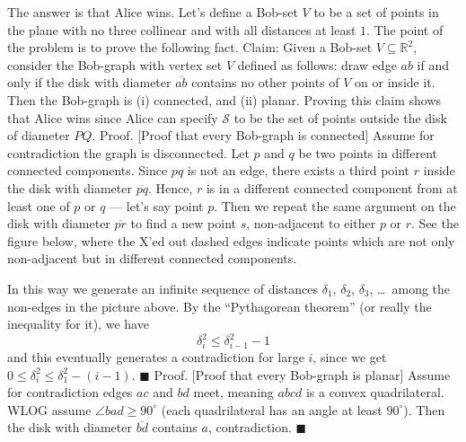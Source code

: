 The answer is that Alice wins. Let's define a Bob-set $V$ to be a set of points in the plane with no three collinear and with all distances at least $1$. The point of the problem is to prove the following fact.
Claim: Given a Bob-set $V \subseteq {\mathbb R}^2$, consider the Bob-graph with vertex set $V$ defined as follows: draw edge $ab$ if and only if the disk with diameter $\overline{ab}$ contains no other points of $V$ on or inside it. Then the Bob-graph is (i) connected, and (ii) planar.
Proving this claim shows that Alice wins since Alice can specify $\mathcal{S}$ to be the set of points outside the disk of diameter $PQ$.
Proof. [Proof that every Bob-graph is connected] Assume for contradiction the graph is disconnected. Let $p$ and $q$ be two points in different connected components. Since $pq$ is not an edge, there exists a third point $r$ inside the disk with diameter $\overline{pq}$.
Hence, $r$ is in a different connected component from at least one of $p$ or $q$ --- let's say point $p$. Then we repeat the same argument on the disk with diameter $\overline{pr}$ to find a new point $s$, non-adjacent to either $p$ or $r$. See the figure below, where the X'ed out dashed edges indicate points which are not only non-adjacent but in different connected components.

In this way we generate an infinite sequence of distances $\delta_1$, $\delta_2$, $\delta_3$, \dots\ among the non-edges in the picture above. By the ``Pythagorean theorem'' (or really the inequality for it), we have\[ \delta_i^2 \le \delta_{i-1}^2 - 1 \]and this eventually generates a contradiction for large $i$, since we get $0 \le \delta_i^2 \le \delta_1^2 - (i-1)$. $\blacksquare$
Proof. [Proof that every Bob-graph is planar] Assume for contradiction edges $ac$ and $bd$ meet, meaning $abcd$ is a convex quadrilateral. WLOG assume $\angle bad \ge 90^{\circ}$ (each quadrilateral has an angle at least $90^{\circ}$). Then the disk with diameter $\overline{bd}$ contains $a$, contradiction. $\blacksquare$